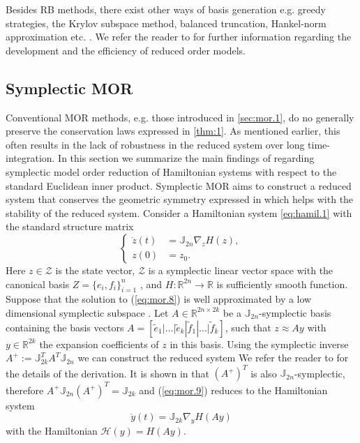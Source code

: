Besides RB methods, there exist other ways of basis generation e.g. greedy strategies, the Krylov subspace method, balanced truncation, Hankel-norm approximation etc. \cite{antoulas2005approximation}. We refer the reader to \cite{hesthaven2015certified,quarteroni2015reduced,Haasdonk2017} for further information regarding the development and the efficiency of reduced order models. 

\subsection{Symplectic MOR} \label{sec:mor.2}
Conventional MOR methods, e.g. those introduced in \cref{sec:mor.1}, do no generally preserve the conservation laws expressed in \cref{thm:1}. As mentioned earlier, this often results in the lack of robustness in the reduced system over long time-integration. In this section we summarize the main findings of \cite{doi:10.1137/17M1111991} regarding symplectic model order reduction of Hamiltonian systems with respect to the standard Euclidean inner product. Symplectic MOR aims to construct a reduced system that conserves the geometric symmetry expressed in  which helps with the stability of the reduced system.
Consider a Hamiltonian system \cref{eq:hamil.1} with the standard structure matrix
\begin{equation} \label{eq:mor.8}
\left\{
\begin{aligned}
	\dot z(t) &= \mathbb J_{2n} \nabla_z H(z), \\
	z(0) &= z_0.
\end{aligned}
\right.
\end{equation}
Here $z\in \mathcal Z$ is the state vector, $\mathcal Z$ is a symplectic linear vector space with the canonical basis $Z =\{ e_i,f_i \}_{i=1}^n$ \cite{Marsden:2010:IMS:1965128}, and $H:\mathbb R^{2n}\to\mathbb R$ is sufficiently smooth function. Suppose that the solution to (\ref{eq:mor.8}) is well approximated by a low dimensional symplectic subspace \cite{Marsden:2010:IMS:1965128}. Let $A\in \mathbb{R}^{2n\times 2k}$ be a $\mathbb{J}_{2n}$-symplectic basis containing the basis vectors $A=[\tilde e_1|\dots|\tilde e_k|\tilde f_1|\dots|\tilde f_k]$, such that $z \approx Ay$ with $y \in \mathbb{R}^{2k}$ the expansion coefficients of $z$ in this basis. Using the symplectic inverse $A^+ := \mathbb J_{2k}^T A^T \mathbb J_{2n}$ we can construct the reduced system
We refer the reader to \cite{doi:10.1137/17M1111991} for the details of the derivation. It is shown in \cite{doi:10.1137/140978922} that $(A^+)^T$ is also $\mathbb J_{2n}$-symplectic, therefore $A^+ \mathbb J_{2n} (A^+)^T = \mathbb J_{2k}$ and (\ref{eq:mor.9}) reduces to the Hamiltonian system
\begin{equation} \label{eq:mor.10}
	\dot y(t) = \mathbb J_{2k} \nabla_y H(Ay)
\end{equation}
with the Hamiltonian $\mathcal H(y) = H(Ay)$.

